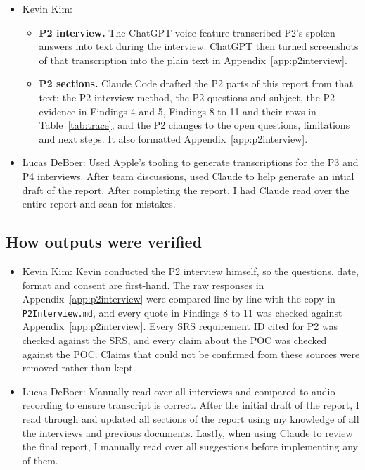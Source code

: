 \documentclass[12pt, titlepage]{article}
\begin{document}
\begin{itemize}
    \item Kevin Kim:
    \begin{itemize}
        \item \textbf{P2 interview.} The ChatGPT voice feature transcribed P2's spoken answers into text during the interview. ChatGPT then turned screenshots of that transcription into the plain text in Appendix~\ref{app:p2interview}.
        \item \textbf{P2 sections.} Claude Code drafted the P2 parts of this report from that text: the P2 interview method, the P2 questions and subject, the P2 evidence in Findings 4 and 5, Findings 8 to 11 and their rows in Table~\ref{tab:trace}, and the P2 changes to the open questions, limitations and next steps. It also formatted Appendix~\ref{app:p2interview}.
    \end{itemize}
    \item Lucas DeBoer: Used Apple's tooling to generate transcriptions for the P3 and P4 interviews. After team discussions, used Claude to help generate an intial draft of the report. After completing the report, 
    I had Claude read over the entire report and scan for mistakes. 
\end{itemize}

\subsection*{How outputs were verified}

\begin{itemize}
    \item Kevin Kim: Kevin conducted the P2 interview himself, so the questions, date, format and consent are first-hand. The raw responses in Appendix~\ref{app:p2interview} were compared line by line with the copy in \texttt{P2Interview.md}, and every quote in Findings 8 to 11 was checked against Appendix~\ref{app:p2interview}. Every SRS requirement ID cited for P2 was checked against the SRS, and every claim about the POC was checked against the POC. Claims that could not be confirmed from these sources were removed rather than kept.
    \item Lucas DeBoer: Manually read over all interviews and compared to audio recording to ensure transcript is correct. After the initial draft of the report, I read through and updated all sections of the report using my knowledge of all the interviews and previous documents. Lastly, when using Claude to review the final report, I manually read over all suggestions before implementing any of them.
\end{itemize}
\end{document}
